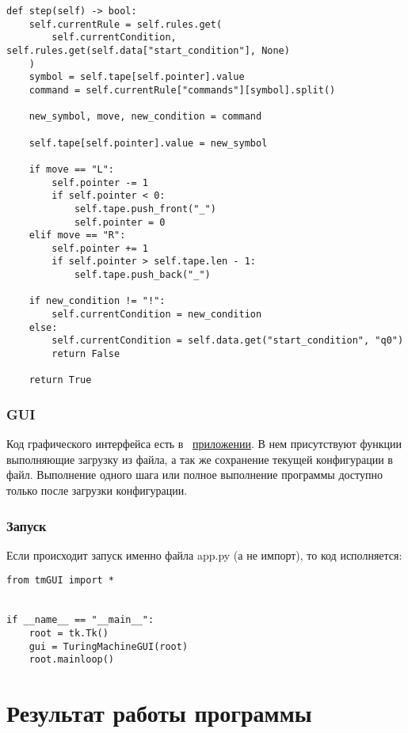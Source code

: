 \begin{lstlisting}
def step(self) -> bool:
    self.currentRule = self.rules.get(
        self.currentCondition, self.rules.get(self.data["start_condition"], None)
    )
    symbol = self.tape[self.pointer].value
    command = self.currentRule["commands"][symbol].split()

    new_symbol, move, new_condition = command

    self.tape[self.pointer].value = new_symbol

    if move == "L":
        self.pointer -= 1
        if self.pointer < 0:
            self.tape.push_front("_")
            self.pointer = 0
    elif move == "R":
        self.pointer += 1
        if self.pointer > self.tape.len - 1:
            self.tape.push_back("_")

    if new_condition != "!":
        self.currentCondition = new_condition
    else:
        self.currentCondition = self.data.get("start_condition", "q0")
        return False

    return True
\end{lstlisting}


\subsubsection{GUI}

Код графического интерфейса есть в ~\hyperlink{word:tmGUI}{приложении}. В нем присутствуют функции выполняющие загрузку из файла, а так же сохранение текущей конфигурации в файл. Выполнение одного шага или полное выполнение программы доступно только после загрузки конфигурации. 


\subsubsection{Запуск}

Если происходит запуск именно файла app.py (а не импорт), то код исполняется:

\begin{lstlisting}
from tmGUI import *


if __name__ == "__main__":
    root = tk.Tk()
    gui = TuringMachineGUI(root)
    root.mainloop()
\end{lstlisting}


\section{Результат работы программы}

